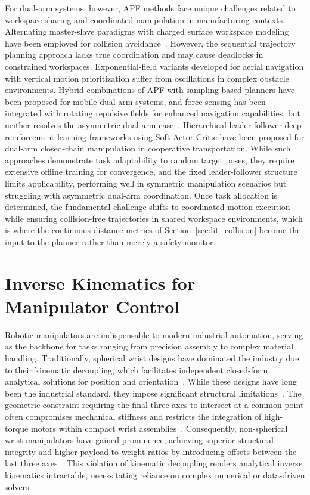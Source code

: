 For dual-arm systems, however, APF methods face unique challenges related to workspace sharing and
coordinated manipulation in manufacturing contexts. Alternating master-slave paradigms with charged
surface workspace modeling have been employed for collision avoidance~\cite{chuang2006alternate}. However, the sequential trajectory planning approach lacks true coordination and may cause deadlocks in constrained workspaces. Exponential-field variants developed for aerial navigation with vertical motion prioritization suffer from oscillations in complex obstacle environments\citep{jayaweera2020dapf}. Hybrid combinations of APF with sampling-based planners have been proposed for mobile dual-arm systems, and force sensing has been integrated with rotating repulsive fields for enhanced navigation capabilities, but neither resolves the asymmetric dual-arm case~\citep{lin2025robot}. Hierarchical leader-follower deep reinforcement learning frameworks using Soft Actor-Critic have been proposed for dual-arm closed-chain manipulation in cooperative transportation\citep{cui2024task, hao2024coordinated}. While such approaches demonstrate task adaptability to random target poses, they require extensive offline training for convergence, and the fixed leader-follower structure limits applicability, performing well in symmetric manipulation scenarios but struggling with asymmetric dual-arm coordination. Once task allocation is determined, the fundamental challenge shifts to coordinated motion execution while ensuring collision-free trajectories in shared workspace environments, which is where the continuous distance metrics of Section~\ref{sec:lit_collision} become the input to the planner rather than merely a safety monitor.

\section{Inverse Kinematics for Manipulator Control}\label{sec:lit_ik}

Robotic manipulators are indispensable to modern industrial automation, serving as the backbone for
tasks ranging from precision assembly to complex material handling. Traditionally, spherical wrist
designs have dominated the industry due to their kinematic decoupling, which facilitates independent
closed-form analytical solutions for position and
orientation~\citep{rodriguez2024singularity}. While these designs have long been the industrial
standard, they impose significant structural limitations~\citep{shah2019comparison}. The geometric
constraint requiring the final three axes to intersect at a common point often compromises
mechanical stiffness and restricts the integration of high-torque motors within compact wrist
assemblies~\citep{ostermeier2025automatic}. Consequently, non-spherical wrist manipulators have
gained prominence, achieving superior structural integrity and higher payload-to-weight ratios by
introducing offsets between the last three axes~\citep{carbonari2023inverse}. This violation of
kinematic decoupling renders analytical inverse kinematics intractable, necessitating reliance on
complex numerical or data-driven solvers.

